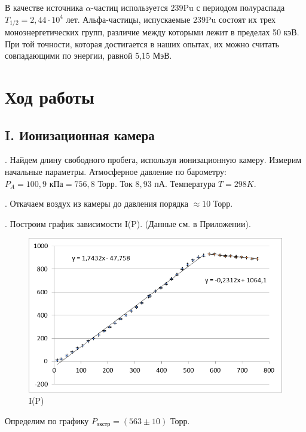 \documentclass[a4paper,12pt]{article} %
\begin{document}
\noindent В качестве источника $\alpha$-частиц используется ${239}$Pu с периодом полураспада $T_{1/2} = 2,44 \cdot 10^4$ лет. Альфа-частицы, испускаемые ${239}$Pu состоят их трех моноэнергетических групп, различие между которыми лежит в пределах 50 кэВ. При той точности, которая достигается в наших опытах, их можно считать совпадающими по энергии, равной 5,15 МэВ.
	
\newpage

\section{Ход работы}

\subsection{I. Ионизационная камера}

. Найдем длину свободного пробега, используя ионизационную камеру. Измерим начальные параметры. Атмосферное давление по барометру: $P_A = 100,9 \text{ кПа} = 756,8 \text{ Торр}.$ Ток $8,93 \text{ пА}.$ Температура $T = 298 K.$

\medskip

. Откачаем воздух из камеры до давления порядка $\approx 10 \text{ Торр}.$

\medskip

. Построим график зависимости I(P). (Данные см. в Приложении).

\begin{figure}[h!]
    \centering
    \includegraphics[scale=0.8]{1.png}
    \caption{I(P)}
    
\end{figure}

\noindent Определим по графику $P_{\text{экстр}} = (563 \pm 10)\text{ Торр}.$
\medskip
\end{document}
